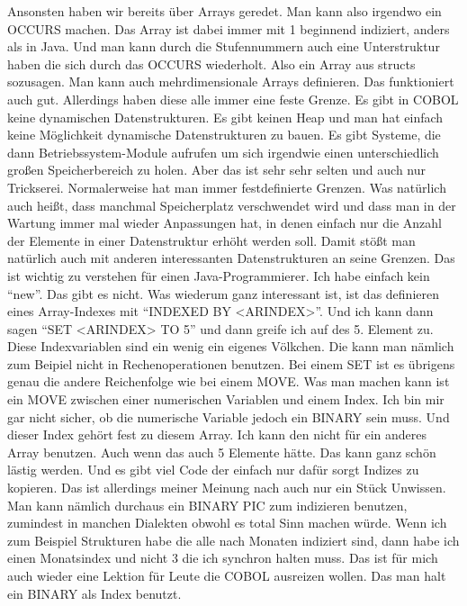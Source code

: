 {Ansonsten haben wir bereits über Arrays geredet. Man kann also irgendwo ein OCCURS machen. Das Array ist dabei immer mit 1 beginnend indiziert, anders als in Java. Und man kann durch die Stufennummern auch eine Unterstruktur haben die sich durch das OCCURS wiederholt. Also ein Array aus structs sozusagen. Man kann auch mehrdimensionale Arrays definieren. Das funktioniert auch gut. Allerdings haben diese alle immer eine feste Grenze. Es gibt in COBOL keine dynamischen Datenstrukturen. Es gibt keinen Heap und man hat einfach keine Möglichkeit dynamische Datenstrukturen zu bauen. Es gibt Systeme, die dann Betriebssystem-Module aufrufen um sich irgendwie einen unterschiedlich großen Speicherbereich zu holen. Aber das ist sehr sehr selten und auch nur Trickserei. Normalerweise hat man immer festdefinierte Grenzen. Was natürlich auch heißt, dass manchmal Speicherplatz verschwendet wird und dass man in der Wartung immer mal wieder Anpassungen hat, in denen einfach nur die Anzahl der Elemente in einer Datenstruktur erhöht werden soll. Damit stößt man natürlich auch mit anderen interessanten Datenstrukturen an seine Grenzen. Das ist wichtig zu verstehen für einen Java-Programmierer. Ich habe einfach kein ``new''. Das gibt es nicht. Was wiederum ganz interessant ist, ist das definieren eines Array-Indexes mit ``INDEXED BY <ARINDEX>''. Und ich kann dann sagen ``SET <ARINDEX> TO 5'' und dann greife ich auf des 5. Element zu. Diese Indexvariablen sind ein wenig ein eigenes Völkchen. Die kann man nämlich zum Beipiel nicht in Rechenoperationen benutzen. Bei einem SET ist es übrigens genau die andere Reichenfolge wie bei einem MOVE. Was man machen kann ist ein MOVE zwischen einer numerischen Variablen und einem Index. Ich bin mir gar nicht sicher, ob die numerische Variable jedoch ein BINARY sein muss. Und dieser Index gehört fest zu diesem Array. Ich kann den nicht für ein anderes Array benutzen. Auch wenn das auch 5 Elemente hätte. Das kann ganz schön lästig werden. Und es gibt viel Code der einfach nur dafür sorgt Indizes zu kopieren. Das ist allerdings meiner Meinung nach auch nur ein Stück Unwissen. Man kann nämlich durchaus ein BINARY PIC zum indizieren benutzen, zumindest in manchen Dialekten obwohl es total Sinn machen würde. Wenn ich zum Beispiel Strukturen habe die alle nach Monaten indiziert sind, dann habe ich einen Monatsindex und nicht 3 die ich synchron halten muss. Das ist für mich auch wieder eine Lektion für Leute die COBOL ausreizen wollen. Das man halt ein BINARY als Index benutzt. }
